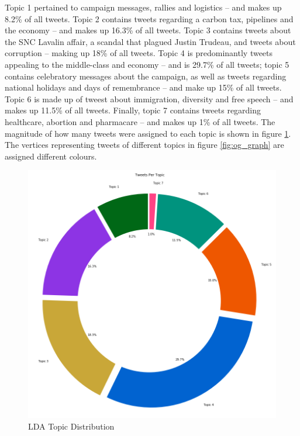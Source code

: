 Topic 1 pertained to campaign messages, rallies and logistics -- and makes up
8.2\% of all tweets. Topic 2 contains tweets regarding a carbon tax, pipelines
and the economy -- and makes up 16.3\% of all tweets. Topic 3 contains tweets
about the SNC Lavalin affair, a scandal that plagued Justin Trudeau, and tweets
about corruption -- making up 18\% of all tweets. Topic 4 is predominantly
tweets appealing to the middle-class and economy -- and is 29.7\% of all tweets;
topic 5 contains celebratory messages about the campaign, as well as tweets
regarding national holidays and days of remembrance -- and make up 15\% of all
tweets. Topic 6 is made up of tweest about immigration, diversity and free
speech -- and makes up 11.5\% of all tweets. Finally, topic 7 contains tweets
regarding healthcare, abortion and pharmacare -- and makes up 1\% of all tweets.
The magnitude of how many tweets were assigned to each topic is shown in figure
\ref{fig:topic_distribution}. The vertices representing tweets of different
topics in figure \ref{fig:og_graph} are assigned different colours. 

\begin{singlespacing}
    \begin{figure}[H]
    \centering
    \includegraphics[scale=0.2]{Figures/topic_distribution}
    \caption[LDA Topic Distribution]{LDA Topic Distribution}
    \label{fig:topic_distribution}
    \end{figure}
\end{singlespacing}






